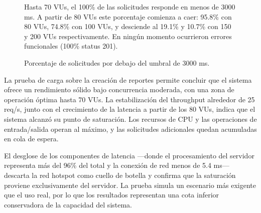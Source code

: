 \begin{figure}[H]
    \centering
    \begin{minipage}{0.55\textwidth}
        \centering
    \end{minipage}
    \hfill
    \begin{minipage}{0.40\textwidth}
        \small
        Hasta 70 VUs, el 100\% de las solicitudes responde en menos de 3000 ms. 
        A partir de 80 VUs este porcentaje comienza a caer: 95.8\% con 80 VUs, 74.8\% con 100 VUs, y desciende al 19.1\% y 10.7\% con 150 y 200 VUs respectivamente. 
        En ningún momento ocurrieron errores funcionales (100\% status 201).
    \end{minipage}
    \caption{Porcentaje de solicitudes por debajo del umbral de 3000 ms.}
    \label{fig:creacion-porcentaje}
\end{figure}


La prueba de carga sobre la creación de reportes permite concluir que el sistema ofrece un rendimiento sólido bajo concurrencia moderada, con una zona de operación óptima hasta 70 VUs.
La estabilización del throughput alrededor de 25 req/s, junto con el crecimiento de la latencia a partir de los 80 VUs, indica que el sistema alcanzó su punto de saturación. 
Los recursos de CPU y las operaciones de entrada/salida operan al máximo, y las solicitudes adicionales quedan acumuladas en cola de espera.

El desglose de los componentes de latencia —donde el procesamiento del servidor representa más del 96\% del total y la conexión de red menos de 5.4 ms— descarta la red hotspot como cuello de botella y confirma que la saturación proviene exclusivamente del servidor.
La prueba simula un escenario más exigente que el uso real, por lo que los resultados representan una cota inferior conservadora de la capacidad del sistema. 


